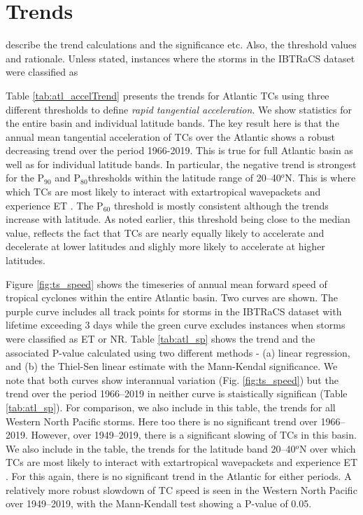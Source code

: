 \documentclass[wcd,manuscript]{copernicus}
\begin{document}
\section{Trends}

describe the trend calculations and the significance etc. Also, the threshold values and rationale. Unless stated, instances where the storms in the IBTRaCS dataset were classified as

Table \ref{tab:atl_accelTrend} presents the trends for Atlantic TCs using three different thresholds to define \emph{rapid tangential acceleration}. We show statistics for the entire basin and individual latitude bands. The key result here is that the annual mean tangential acceleration of TCs over the Atlantic shows a robust decreasing trend over the period 1966-2019. This is true for full Atlantic basin as well as for individual latitude bands. In particular, the negative trend is strongest for the P$_{90}$ and P$_{80}$thresholds within the latitude range of 20--40$^o$N. This is where which TCs are most likely to interact with extartropical wavepackets and experience ET \citep[e.g.][]{HE2001}. The P$_{60}$ threshold is mostly consistent although the trends increase with latitude. As noted earlier, this threshold being close to the median value, reflects the fact that TCs are nearly equally likely to accelerate and decelerate at lower latitudes and slighly more likely to accelerate at higher latitudes. 



Figure \ref{fig:ts_speed} shows the timeseries of annual mean forward speed of tropical cyclones within the entire Atlantic basin. Two curves are shown. The purple curve includes all track points for storms in the IBTRaCS dataset with lifetime exceeding 3 days while the green curve excludes instances when storms were classified as ET or NR. Table \ref{tab:atl_sp} shows the trend and the associated P-value calculated using two different methods - (a) linear regression, and (b) the Thiel-Sen linear estimate with the Mann-Kendal significance. We note that both curves show interannual variation (Fig. \ref{fig:ts_speed}) but the trend over the period 1966--2019 in neither curve is staistically significan (Table \ref{tab:atl_sp}). For comparison, we also include in this table, the trends for all Western North Pacific storms. Here too there is no significant trend over 1966--2019. However, over 1949--2019, there is a significant slowing of TCs in this basin. We also include in the table, the trends for the latitude band 20--40$^o$N over which TCs are most likely to interact with extartropical wavepackets and experience ET \citep[e.g.][]{HE2001}. For this again, there is no significant trend in the Atlantic for either periods. A relatively more robust slowdown of TC speed is seen in the Western North Pacific over  1949--2019, with the Mann-Kendall test showing a P-value of 0.05.
\end{document}
